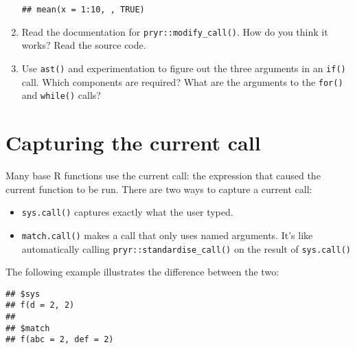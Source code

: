 \begin{enumerate}
\begin{verbatim}
## mean(x = 1:10, , TRUE)
\end{verbatim}
\item
  Read the documentation for \texttt{pryr::modify\_call()}. How do you
  think it works? Read the source code.
\item
  Use \texttt{ast()} and experimentation to figure out the three
  arguments in an \texttt{if()} call. Which components are required?
  What are the arguments to the \texttt{for()} and \texttt{while()}
  calls?
\end{enumerate}

\hypertarget{capturing-call}{%
\section{Capturing the current call}\label{capturing-call}}

Many base R functions use the current call: the expression that caused
the current function to be run. There are two ways to capture a current
call: 

\begin{itemize}
\item
  \texttt{sys.call()} captures exactly what the user typed.
\item
  \texttt{match.call()} makes a call that only uses named arguments.
  It's like automatically calling \texttt{pryr::standardise\_call()} on
  the result of \texttt{sys.call()} 
\end{itemize}

The following example illustrates the difference between the two:

\begin{Shaded}
\begin{Highlighting}[]
\StringTok{ }\NormalTok{(} \NormalTok{, } \NormalTok{, } \NormalTok{) \{}
  \NormalTok{(} \NormalTok{(), } \NormalTok{())}
\NormalTok{\}}
\NormalTok{(} \NormalTok{, }\NormalTok{)}
\end{Highlighting}
\end{Shaded}

\begin{verbatim}
## $sys
## f(d = 2, 2)
## 
## $match
## f(abc = 2, def = 2)
\end{verbatim}

